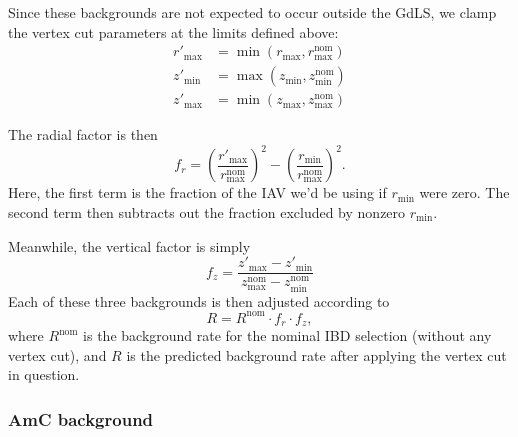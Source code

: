 \documentclass[../thesis.tex]{subfiles}
\begin{document}
Since these backgrounds are not expected to occur outside the GdLS, we clamp the vertex cut parameters at the limits defined above:
\begin{equation}
  \begin{aligned}
  r'_{\mathrm{max}} &= \min(r_{\mathrm{max}}, r_{\mathrm{max}}^{\mathrm{nom}})\\
  z'_{\mathrm{min}} &= \max(z_{\mathrm{min}}, z_{\mathrm{min}}^{\mathrm{nom}})\\
  z'_{\mathrm{max}} &= \min(z_{\mathrm{max}}, z_{\mathrm{max}}^{\mathrm{nom}})
\end{aligned}
\end{equation}

The radial factor is then
\begin{equation}
  f_r = \left(\frac{r'_{\mathrm{max}}}{r_{\mathrm{max}}^{\mathrm{nom}}}\right)^2 - \left(\frac{r_{\mathrm{min}}}{r_{\mathrm{max}}^{\mathrm{nom}}} \right)^2.
\end{equation}
Here, the first term is the fraction of the IAV we'd be using if $r_{\mathrm{min}}$ were zero. The second term then subtracts out the fraction excluded by nonzero $r_{\mathrm{min}}$.

Meanwhile, the vertical factor is simply
\begin{equation}
  f_z = \frac{z'_{\mathrm{max}} - z'_{\mathrm{min}}}{z_{\mathrm{max}}^{\mathrm{nom}} - z_{\mathrm{min}}^{\mathrm{nom}}}
\end{equation}
Each of these three backgrounds is then adjusted according to
\begin{equation}
  R = R^{\mathrm{nom}} \cdot f_r \cdot f_z,
\end{equation}
where $R^{\mathrm{nom}}$ is the background rate for the nominal IBD selection (without any vertex cut), and $R$ is the predicted background rate after applying the vertex cut in question.

\subsubsection{AmC background}
\end{document}
